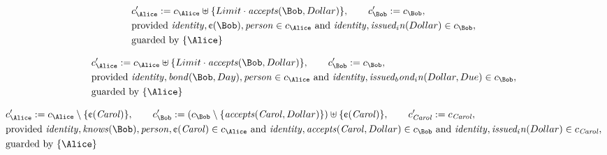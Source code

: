\begin{align*}
&
c'_
{
\Alice
}
 := 
c_
{
\Alice
}
 \uplus 
\{
Limit
\cdot
\mathit{
accepts
}
(
\Bob
,
Dollar
)
\}
, \qquad 
c'_
{
\Bob
}
 := 
c_
{
\Bob
}
,\\
&
\text{provided } 
\mathit{
identity
}
,
\text{\textcent}
(
\Bob
)
,
\mathit{
person
}
 \in c_
{
\Alice
}
 \text{ and } 
\mathit{
identity
}
,
\mathit{
issued_in
}
(
Dollar
)
 \in c_
{
\Bob
}
,\\
&
\text{guarded by } \{
\Alice
\}
\end{align*}

\begin{align*}
&
c'_
{
\Alice
}
 := 
c_
{
\Alice
}
 \uplus 
\{
Limit
\cdot
\mathit{
accepts
}
(
\Bob
,
Dollar
)
\}
, \qquad 
c'_
{
\Bob
}
 := 
c_
{
\Bob
}
,\\
&
\text{provided } 
\mathit{
identity
}
,
\mathit{
bond
}
(
\Bob
,
Day
)
,
\mathit{
person
}
 \in c_
{
\Alice
}
 \text{ and } 
\mathit{
identity
}
,
\mathit{
issued_bond_in
}
(
Dollar
,
Due
)
 \in c_
{
\Bob
}
,\\
&
\text{guarded by } \{
\Alice
\}
\end{align*}

\begin{align*}
&
c'_
{
\Alice
}
 := 
c_
{
\Alice
}
 \setminus 
\{
\text{\textcent}
(
\mathit{Carol}
)
\}
, \qquad 
c'_
{
\Bob
}
 := 
(c_
{
\Bob
}
 \setminus 
\{
\mathit{
accepts
}
(
\mathit{Carol}
,
Dollar
)
\}
) \uplus 
\{
\text{\textcent}
(
\mathit{Carol}
)
\}
, \qquad 
c'_
{
\mathit{Carol}
}
 := 
c_
{
\mathit{Carol}
}
,\\
&
\text{provided } 
\mathit{
identity
}
,
\mathit{
knows
}
(
\Bob
)
,
\mathit{
person
}
,
\text{\textcent}
(
\mathit{Carol}
)
 \in c_
{
\Alice
}
 \text{ and } 
\mathit{
identity
}
,
\mathit{
accepts
}
(
\mathit{Carol}
,
Dollar
)
 \in c_
{
\Bob
}
 \text{ and } 
\mathit{
identity
}
,
\mathit{
issued_in
}
(
Dollar
)
 \in c_
{
\mathit{Carol}
}
,\\
&
\text{guarded by } \{
\Alice
\}
\end{align*}

